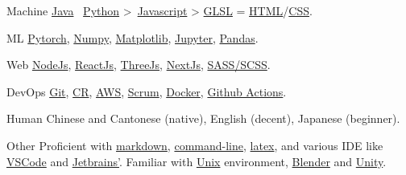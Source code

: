 
\begin{cvskills}
  \cvskill
  {Machine}
  {\href{https://www.java.com/en/}{Java} \approx\, \href{https://www.python.org/}{Python} >\, \href{https://www.javascript.com/}{Javascript} > \href{https://www.khronos.org/opengl/wiki/OpenGL_Shading_Language}{GLSL} = \href{https://developer.mozilla.org/en-US/docs/Glossary/HTML5}{HTML}/\href{https://developer.mozilla.org/en-US/docs/Web/CSS}{CSS}.}
  
  \cvskill
  {ML} %
  {\href{https://pytorch.org/}{Pytorch}, \href{https://numpy.org/}{Numpy}, \href{https://matplotlib.org/}{Matplotlib}, \href{https://jupyter.org/}{Jupyter}, \href{https://pandas.pydata.org/}{Pandas}.}  %

  \cvskill
  {Web} %
  {\href{https://nodejs.org/en/}{NodeJs}, \href{https://reactjs.org/}{ReactJs}, \href{https://threejs.org/}{ThreeJs}, \href{https://nextjs.org/}{NextJs}, \href{https://sass-lang.com/}{SASS/SCSS}.}
  
  \cvskill
    {DevOps} %
    {\href{https://git-scm.com/}{Git}, \href{https://en.wikipedia.org/wiki/Code_review}{CR}, \href{https://aws.amazon.com/}{AWS}, \href{https://www.scrum.org/resources/what-is-scrum}{Scrum}, \href{https://www.docker.com/}{Docker}, \href{https://github.com/features/actions}{Github Actions}.}
 
  \cvskill
    {Human}
    {Chinese and Cantonese (native), English (decent), Japanese (beginner).}

  \cvskill
    {Other} %
    {Proficient with \href{https://en.wikipedia.org/wiki/Markdown}{markdown}, \href{https://en.wikipedia.org/wiki/Command-line_interface}{command-line}, \href{https://www.latex-project.org/}{latex}, and various IDE like \href{https://code.visualstudio.com/}{VSCode} and \href{https://www.jetbrains.com/}{Jetbrains'}. Familiar with \href{https://en.wikipedia.org/wiki/Unix}{Unix} environment, \href{https://www.blender.org/}{Blender} and \href{https://unity.com/}{Unity}.}

\end{cvskills}
